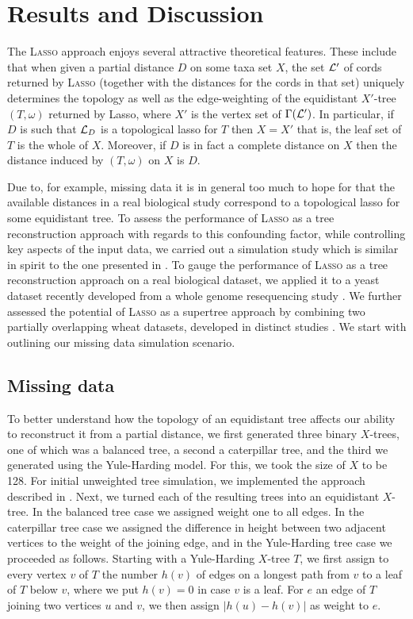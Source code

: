 \section{Results and Discussion}
\label{sec:results}

The \textsc{Lasso} approach enjoys several attractive theoretical features. These
include that when given a partial distance $D$ on some taxa set $X$, the set
${\mathcal L}'$ of cords returned by \textsc{Lasso} (together with the distances for the
cords in that set) uniquely determines the topology as well as the
edge-weighting of the equidistant $X'$-tree $(T,\omega)$ returned by {\sc
  Lasso}, where $X'$ is the vertex set of $\Gamma({\mathcal L}')$.  In particular, if
$D$ is such that ${\mathcal L}_D$ is a topological lasso for $T$ then $X=X'$ that is,
the leaf set of $T$ is the whole of $X$.  Moreover, if $D$ is in fact a
complete distance on $X$ then the distance induced by $(T,\omega)$ on $X$ is
$D$.

Due to, for example, missing data it is in general too much to hope for that
the available distances in a real biological study correspond to a topological
lasso for some equidistant tree. To assess the performance of \textsc{Lasso}
as a tree reconstruction approach with regards to this confounding factor,
while controlling key aspects of the input data, we carried out a simulation
study which is similar in spirit to the one presented in
\cite{criscuolo2008fastnj}.  To gauge the performance of \textsc{Lasso} as a
tree reconstruction approach on a real biological dataset, we applied it to a
yeast dataset \cite{west14ribosomal} recently developed from a whole genome
resequencing study \cite{liti}. We further assessed the potential of
\textsc{Lasso} as a supertree approach by combining two partially overlapping
wheat datasets, developed in distinct studies \cite{gediflux, muge}.  We start
with outlining our missing data simulation scenario.

\subsection{Missing data}
\label{sec:missing-data-disc}

To better understand how the topology of an equidistant tree affects our
ability to reconstruct it from a partial distance, we first generated three
binary $X$-trees, one of which was a balanced tree, a second a caterpillar
tree, and the third we generated using the Yule-Harding model. For this, we
took the size of $X$ to be 128.  For initial unweighted tree simulation, we
implemented the approach described in \cite[Section
2.5]{semple2003phylogenetics}.  Next, we turned each of the resulting trees
into an equidistant $X$-tree. In the balanced tree case we assigned weight one
to all edges. In the caterpillar tree case we assigned the difference in
height between two adjacent vertices to the weight of the joining edge, and in
the Yule-Harding tree case we proceeded as follows. Starting with a
Yule-Harding $X$-tree $T$, we first assign to every vertex $v$ of $T$ the
number $h(v)$ of edges on a longest path from $v$ to a leaf of $T$ below $v$,
where we put $h(v)=0$ in case $v$ is a leaf.  For $e$ an edge of $T$ joining
two vertices $u$ and $v$, we then assign $|h(u)-h(v)|$ as weight to $e$.

